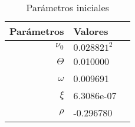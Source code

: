 \clearpage
\begin{table}[h]
\begin{center}
\begin{tabular}{| r | l | c |}
\hline 
Parámetros & Valores  \\ \hline
$\nu_0$ & $0.028821^2$  \\
$\Theta$ & 0.010000  \\
$\omega$ & 0.009691    \\
$\xi$ & 6.3086e-07   \\
$\rho$ & -0.296780 \\ \hline
\end{tabular}
\caption{Parámetros iniciales}
\label{tab:fruta}
\end{center}
\end{table}

\newpage